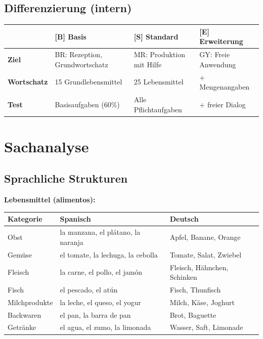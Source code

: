 \documentclass[11pt,a4paper]{article}
\newcommand{\B}{\textcolor{basis}{\textbf{[B]}}}
\newcommand{\Std}{\textcolor{standard}{\textbf{[S]}}}
\newcommand{\E}{\textcolor{erweiterung}{\textbf{[E]}}}
\begin{document}
\subsection{Differenzierung (intern)}
\begin{tabular}{|l|p{3.5cm}|p{3.5cm}|p{3.5cm}|}
\hline
& \B{} \textbf{Basis} & \Std{} \textbf{Standard} & \E{} \textbf{Erweiterung} \\
\hline
\textbf{Ziel} & BR: Rezeption, Grundwortschatz & MR: Produktion mit Hilfe & GY: Freie Anwendung \\
\hline
\textbf{Wortschatz} & 15 Grundlebensmittel & 25 Lebensmittel & + Mengenangaben \\
\hline
\textbf{Test} & Basisaufgaben (60\%) & Alle Pflichtaufgaben & + freier Dialog \\
\hline
\end{tabular}

\section{Sachanalyse}

\subsection{Sprachliche Strukturen}

\textbf{Lebensmittel (alimentos):}
\begin{center}
\begin{tabular}{|l|l|l|}
\hline
\textbf{Kategorie} & \textbf{Spanisch} & \textbf{Deutsch} \\
\hline
Obst & la manzana, el plátano, la naranja & Apfel, Banane, Orange \\
\hline
Gemüse & el tomate, la lechuga, la cebolla & Tomate, Salat, Zwiebel \\
\hline
Fleisch & la carne, el pollo, el jamón & Fleisch, Hähnchen, Schinken \\
\hline
Fisch & el pescado, el atún & Fisch, Thunfisch \\
\hline
Milchprodukte & la leche, el queso, el yogur & Milch, Käse, Joghurt \\
\hline
Backwaren & el pan, la barra de pan & Brot, Baguette \\
\hline
Getränke & el agua, el zumo, la limonada & Wasser, Saft, Limonade \\
\hline
\end{tabular}
\end{center}
\end{document}
